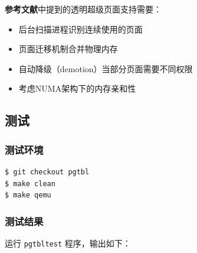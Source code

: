 \textbf{参考文献}中提到的透明超级页面支持需要：
\begin{itemize}
    \item 后台扫描进程识别连续使用的页面
    \item 页面迁移机制合并物理内存
    \item 自动降级（demotion）当部分页面需要不同权限
    \item 考虑NUMA架构下的内存亲和性
\end{itemize}

\subsection{测试}

\subsubsection{测试环境}

\begin{lstlisting}[language=bash]
$ git checkout pgtbl
$ make clean
$ make qemu
\end{lstlisting}

\subsubsection{测试结果}

运行 \texttt{pgtbltest} 程序，输出如下：

